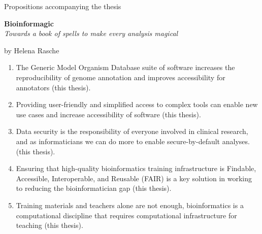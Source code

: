 \documentclass[School=EMC]{Dissertate}
\begin{document}
\begin{center}
Propositions accompanying the thesis

\textbf{\large Bioinformagic}\\
\textit{Towards a book of spells to make every analysis magical}

by Helena Rasche
\end{center}



\begin{enumerate}
\item The Generic Model Organism Database suite of software increases the reproducibility of genome annotation and improves accessibility for annotators (this thesis).
\item Providing user-friendly and simplified access to complex tools can enable new use cases and increase accessibility of software (this thesis).

\item Data security is the responsibility of everyone involved in clinical research, and as informaticians we can do more to enable secure-by-default analyses. (this thesis).

\item Ensuring that high-quality bioinformatics training infrastructure is Findable, Accessible, Interoperable, and Reusable (FAIR) is a key solution in working to reducing the bioinformatician gap (this thesis).
\item Training materials and teachers alone are not enough, bioinformatics is a computational discipline that requires computational infrastructure for teaching (this thesis).



\end{enumerate}
\end{document}
